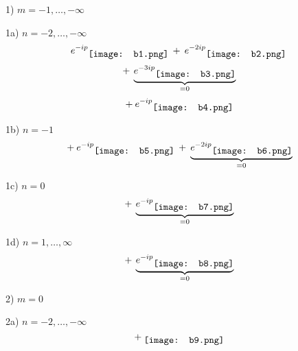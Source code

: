 \begin{center}

1) $m = -1, \ldots, - \infty$ 

\vspace{1em} 

1a) $n = -2, \ldots, - \infty$ 
\begin{equation*}
	e^{-ip} 
	\raisebox{-0.5\height}{\texttt{[image: b1.png]}} 
	\: + \: 
	e^{-2ip} 
	\raisebox{-0.5\height}{\texttt{[image: b2.png]}} 
\end{equation*}
\begin{equation*}
	\: + \: 
	\underbrace{e^{-3ip} 
	\raisebox{-0.5\height}{\texttt{[image: b3.png]}}}_{=0} 
\end{equation*}
\begin{equation*}
	\: + \: e^{-ip} 
	\raisebox{-0.5\height}{\texttt{[image: b4.png]}} 
\end{equation*}

\vspace{1em} 

1b) $n = -1$ 
\begin{equation*}
	\: + \: e^{-ip} 
	\raisebox{-0.5\height}{\texttt{[image: b5.png]}} 
	\: + \: 
	\underbrace{e^{-2ip} 
	\raisebox{-0.5\height}{\texttt{[image: b6.png]}}}_{=0}
\end{equation*}

\vspace{1em} 

1c) $n = 0$
\begin{equation*}
	\: + \: \underbrace{e^{-ip} 
	\raisebox{-0.5\height}{\texttt{[image: b7.png]}}}_{=0}
\end{equation*}

\vspace{1em} 

1d) $n = 1, \ldots, \infty$
\begin{equation*}
	\: + \: \underbrace{e^{-ip} 
	\raisebox{-0.5\height}{\texttt{[image: b8.png]}}}_{=0}
\end{equation*}

\vspace{1em} 

2) $m = 0$

\vspace{1em} 

2a) $n = -2, \ldots, - \infty$ 
\begin{equation*}
	\: + \: 
	\raisebox{-0.5\height}{\texttt{[image: b9.png]}} 
\end{equation*}


\end{center}
